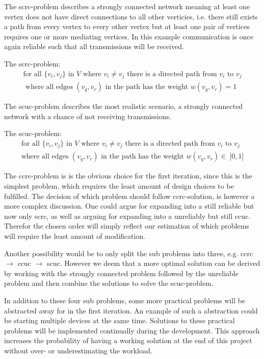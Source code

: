 \noindent The \gls{scrc}-problem describes a strongly connected network meaning at least one vertex does not have direct connections to all other verticies, i.e. there still exists a path from every vertex to every other vertex but at least one pair of vertices requires one or more mediating vertices. 
In this example communication is once again reliable such that all transmissions will be received. 

\begin{definition}
	The \acrshort{scrc}-problem:
	\begin{align*}
		\text{for all } \{v_i, v_j\} \text{ in } V \text{ where } v_i \neq v_j \text{ there is a directed path from } v_i \text{ to } v_j\\
		\text{ where all edges } (v_q, v_r) \text{ in the path has the weight } w(v_q, v_r) = 1
	\end{align*}
\end{definition}

\noindent The \gls{scuc}-problem describes the most realistic scenario, a strongly connected network with a chance of not receiving transmissions. 

\begin{definition}
	The \acrshort{scuc}-problem:
	\begin{align*}
		\text{for all } \{v_i, v_j\} \text{ in } V \text{ where } v_i \neq v_j \text{ there is a directed path from } v_i \text{ to } v_j\\
		\text{where all edges } (v_q, v_r) \text{ in the path has the weight } w(v_q, v_r) \in\ ]0,1]
	\end{align*}
\end{definition}

\bigskip 
\noindent
The \gls{ccrc}-problem is is the obvious choice for the first iteration, since this is the simplest problem, which requires the least amount of design choices to be fulfilled.
The decision of which problem should follow \gls{ccrc}-solution, is however a more complex discussion.
One could argue for expanding into a still reliable but now only \acrlong{scrc}, as well as arguing for expanding into a unreliably but still \acrlong{ccuc}.
Therefor the chosen order will simply reflect our estimation of which problems will require the least amount of modification.

Another possibility would be to only split the sub problems into three, e.g. \gls{ccrc} $\rightarrow$ \gls{ccuc} $\rightarrow$ \gls{scuc}.
However we deem that a more optimal solution can be derived by working with the strongly connected problem followed by the unreliable problem and then combine the solutions to solve the \gls{scuc}-problem.

In addition to these four sub problems, some more practical problems will be abstracted away for in the first iteration.
An example of such a abstraction could be starting multiple devices at the same time.
Solutions to these practical problems will be implemented continually during the development. 
This approach increases the probability of having a working solution at the end of this project without over- or underestimating the workload. 
